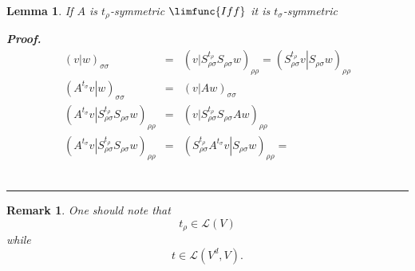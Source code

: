 \documentclass[aps,preprint]{revtex4}
\newtheorem{lemma}[theorem]{Lemma}
\newtheorem{remark}[theorem]{Remark}
\newenvironment{proof}[1][Proof]{\noindent\textbf{#1.} }{\ \rule{0.5em}{0.5em}}
\begin{document}
\begin{lemma}
If $A$ is $t_{\rho }$-symmetric $\limfunc{Iff}$ it is $t_{\sigma }$-symmetric

\begin{proof}
\begin{eqnarray}
\left( \left. v\right\vert w\right) _{\sigma \sigma } &=&\left( \left.
v\right\vert S_{\rho \sigma }^{t_{\rho }}S_{\rho \sigma }w\right) _{\rho
\rho }=\left( \left. S_{\rho \sigma }^{t_{\rho }}v\right\vert S_{\rho \sigma
}w\right) _{\rho \rho } \\
\left( \left. A^{t_{\sigma }}v\right\vert w\right) _{\sigma \sigma }
&=&\left( \left. v\right\vert Aw\right) _{\sigma \sigma } \\
\left( \left. A^{t_{\sigma }}v\right\vert S_{\rho \sigma }^{t_{\rho
}}S_{\rho \sigma }w\right) _{\rho \rho } &=&\left( \left. v\right\vert
S_{\rho \sigma }^{t_{\rho }}S_{\rho \sigma }Aw\right) _{\rho \rho } \\
\left( \left. A^{t_{\sigma }}v\right\vert S_{\rho \sigma }^{t_{\rho
}}S_{\rho \sigma }w\right) _{\rho \rho } &=&\left( \left. S_{\rho \sigma
}^{t_{\rho }}A^{t_{\sigma }}v\right\vert S_{\rho \sigma }w\right) _{\rho
\rho }=
\end{eqnarray}
\end{proof}
\end{lemma}

\begin{remark}
One should note that 
\begin{equation}
t_{\rho }\in \mathcal{L}\left( V\right)
\end{equation}%
while%
\begin{equation}
t\in \mathcal{L}\left( V^{d},V\right) .
\end{equation}
\end{remark}
\end{document}

